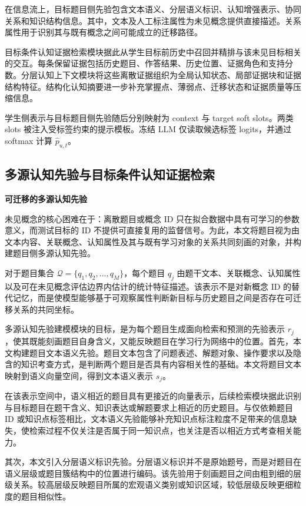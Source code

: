 \documentclass[UTF8,a4paper,12pt]{ctexart}
\numberwithin{table}{section}
\begin{document}
在信息流上，目标题目侧先验包含文本语义、分层语义标识、认知增强表示、协同关系和知识结构信息。其中，文本及人工标注属性为未见概念提供直接描述。关系属性用于识别其与既有概念之间可能成立的迁移路径。

目标条件认知证据检索模块据此从学生目标前历史中召回并精排与该未见目标相关的交互。每条保留证据包括历史题目、作答结果、历史位置、证据角色和支持分数。分层认知上下文模块将这些离散证据组织为全局认知状态、局部证据块和证据结构特征。结构化认知摘要进一步补充掌握点、薄弱点、迁移状态和证据质量等压缩信息。

学生侧表示与目标题目侧先验随后分别映射为 context 与 target soft slots。两类 slots 被注入受标签约束的提示模板。冻结 LLM 仅读取候选标签 logits，并通过 softmax 计算 \(\hat{p}_{u,t}\)。

\subsection{多源认知先验与目标条件认知证据检索}

\noindent\textbf{可迁移的多源认知先验}



未见概念的核心困难在于：离散题目或概念 ID 只在拟合数据中具有可学习的参数意义，而测试目标的 ID 不提供可直接复用的监督信号。为此，本文将题目视为由文本内容、关联概念、认知属性及其与既有学习对象的关系共同刻画的对象，并构建题目侧多源认知先验。

对于题目集合 \(\mathcal{Q}=\{q_1,q_2,\ldots,q_M\}\)，每个题目 \(q_j\) 由题干文本、关联概念、认知属性以及可在未见概念评估边界内估计的统计特征描述。该表示不是对新概念 ID 的替代记忆，而是使模型能够基于可观察属性判断新目标与历史题目之间是否存在可迁移关系的共同坐标。

多源认知先验建模模块的目标，是为每个题目生成面向检索和预测的先验表示 \(r_j\)，使其既能刻画题目自身含义，又能反映题目在学习行为网络中的位置。首先，本文构建题目文本语义先验。题目文本包含了问题表述、解题对象、操作要求以及隐含的知识考查方式，是判断两个题目是否具有内容相关性的基础。本文将题目文本映射到语义向量空间，得到文本语义表示 \(s_j\)。

在该表示空间中，语义相近的题目具有更接近的向量表示，后续检索模块据此识别与目标题目在题干含义、知识表达或解题要求上相近的历史题目。与仅依赖题目 ID 或知识点标签相比，文本语义先验能够补充知识点标注粒度不足带来的信息缺失，使检索过程不仅关注是否属于同一知识点，也关注是否以相近方式考查相关能力。

其次，本文引入分层语义标识先验。分层语义标识并不是原始题号，而是对题目在语义层级或题目簇结构中的位置进行编码。该先验用于刻画题目之间由粗到细的层级关系。较高层级反映题目所属的宏观语义类别或知识区域，较低层级反映更细粒度的题目相似性。
\end{document}
